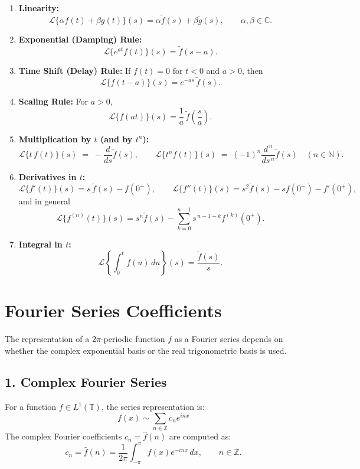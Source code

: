 \documentclass[12pt]{article}
\begin{document}
\begin{enumerate}[label=(\roman*)]
  \item \textbf{Linearity:}
  \[
  \mathcal{L}\{\alpha f(t) + \beta g(t)\}(s)
  = \alpha \tilde{f}(s) + \beta \tilde{g}(s),
  \qquad \alpha, \beta \in \mathbb{C}.
  \]

  \item \textbf{Exponential (Damping) Rule:}
  \[
  \mathcal{L}\{e^{a t} f(t)\}(s)
  = \tilde{f}(s - a).
  \]

  \item \textbf{Time Shift (Delay) Rule:}
  If $f(t) = 0$ for $t < 0$ and $a > 0$, then
  \[
  \mathcal{L}\{f(t - a)\}(s)
  = e^{-a s}\,\tilde{f}(s).
  \]

  \item \textbf{Scaling Rule:}
  For $a > 0$,
  \[
  \mathcal{L}\{f(a t)\}(s)
  = \frac{1}{a}\,\tilde{f}\!\left(\frac{s}{a}\right).
  \]
  \item \textbf{Multiplication by $t$ (and by $t^n$):}
  \[
    \mathcal{L}\{t\,f(t)\}(s) \;=\; -\frac{d}{ds}\tilde f(s), 
    \qquad
    \mathcal{L}\{t^{n}f(t)\}(s) \;=\; (-1)^{n}\frac{d^{\,n}}{ds^{\,n}}\tilde f(s)\quad (n\in\mathbb{N}).
  \]

  \item \textbf{Derivatives in $t$:}
  \[
    \mathcal{L}\{f'(t)\}(s)=s\,\tilde f(s)-f(0^+),\qquad
    \mathcal{L}\{f''(t)\}(s)=s^{2}\tilde f(s)-s f(0^+)-f'(0^+),
  \]
  and in general
  \[
    \mathcal{L}\{f^{(n)}(t)\}(s)=s^{n}\tilde f(s)-\sum_{k=0}^{n-1}s^{\,n-1-k}f^{(k)}(0^+).
  \]

  \item \textbf{Integral in $t$:}
  \[
    \mathcal{L}\!\left\{\int_{0}^{t} f(u)\,du\right\}(s)=\frac{\tilde f(s)}{s}.
  \]
\end{enumerate}

\section*{Fourier Series Coefficients}

The representation of a $2\pi$-periodic function $f$ as a Fourier series depends on whether the complex exponential basis or the real trigonometric basis is used.

\subsection*{1. Complex Fourier Series}
For a function $f \in L^1(\mathbb{T})$, the series representation is:
\[
  f(x) \sim \sum_{n \in \mathbb{Z}} c_n e^{inx}
\]
The complex Fourier coefficients $c_n = \hat{f}(n)$ are computed as:
\[
  c_n = \hat{f}(n) = \frac{1}{2\pi}\int_{-\pi}^{\pi} f(x)e^{-inx}\,dx, \qquad n\in\mathbb{Z}.
\]
\end{document}
